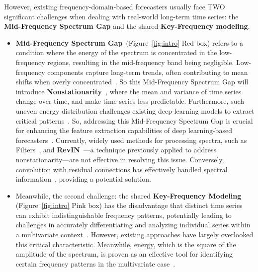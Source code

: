However, existing frequency-domain-based forecasters usually face TWO significant challenges when dealing with real-world long-term time series:
the \textbf{Mid-Frequency Spectrum Gap} and the shared \textbf{Key-Frequency modeling}. 
\begin{itemize}
\item \textbf{Mid-Frequency Spectrum Gap}~(Figure~\ref{fig:intro} \textcolor[RGB]{255,0,0}{Red} box) refers to a condition where the energy of the spectrum is concentrated in the low-frequency regions, resulting in the mid-frequency band being negligible. 
%
Low-frequency components capture long-term trends, often contributing to mean shifts when overly concentrated~\citep{stock2002low,granger1974low,chatfield2019low}. So this Mid-Frequency Spectrum Gap will introduce \textbf{Nonstationarity}~\citep{cheng2015nonstationarity,liu2022non}, where the mean and variance of time series change over time, and make time series less predictable. 
%
Furthermore, such uneven energy distribution challenges existing deep-learning models to extract critical patterns~\citep{Tishby2015full,xu2024full,rahaman2019full}. So, addressing this Mid-Frequency Spectrum Gap is crucial for enhancing the feature extraction capabilities of deep learning-based forecasters~\citep{park2019mid,bai2018mid,guo2019mid}. 
Currently, widely used methods for processing spectra, such as Filters~\citep{asselin1972frequencyfilter}, and \textbf{RevIN}~\citep{Kim_revin,liu2022non}—a technique previously applied to address nonstationarity—are not effective in resolving this issue. Conversely, convolution with residual connections has effectively handled spectral information~\citep{can2018conv,chakraborty2021conv}, providing a potential solution.
\item Meanwhile, the second challenge: the shared \textbf{Key-Frequency Modeling} (Figure~\ref{fig:intro} \textcolor[RGB]{255, 102, 255}{Pink} box) has the disadvantage that distinct time series can exhibit indistinguishable frequency patterns, potentially leading to challenges in accurately differentiating and analyzing individual series within a multivariate context~\citep{yu2023dsformer,Piao2024fredformer}.
% 
However, existing approaches have largely overlooked this critical characteristic. Meanwhile, energy, which is the square of the amplitude of the spectrum, is proven as an effective tool for identifying certain frequency patterns in the multivariate case~\citep{bogalo2024ekpb,chekroun2017ekpb,sundararajan2023ekpb}.
\end{itemize}

